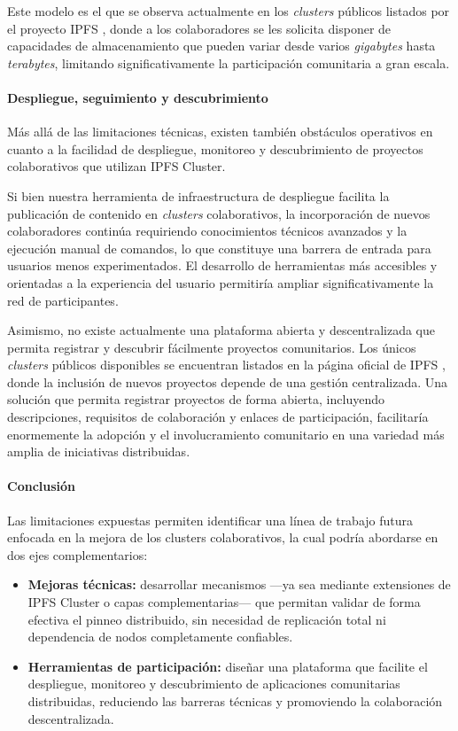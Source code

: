 Este modelo es el que se observa actualmente en los \textit{clusters} públicos listados por el proyecto IPFS \cite{collaborative-clusters}, donde a los colaboradores se les solicita disponer de capacidades de almacenamiento que pueden variar desde varios \textit{gigabytes} hasta \textit{terabytes}, limitando significativamente la participación comunitaria a gran escala.

\paragraph{Despliegue, seguimiento y descubrimiento}

Más allá de las limitaciones técnicas, existen también obstáculos operativos en cuanto a la facilidad de despliegue, monitoreo y descubrimiento de proyectos colaborativos que utilizan IPFS Cluster.

Si bien nuestra herramienta de infraestructura de despliegue facilita la publicación de contenido en \textit{clusters} colaborativos, la incorporación de nuevos colaboradores continúa requiriendo conocimientos técnicos avanzados y la ejecución manual de comandos, lo que constituye una barrera de entrada para usuarios menos experimentados. El desarrollo de herramientas más accesibles y orientadas a la experiencia del usuario permitiría ampliar significativamente la red de participantes.

Asimismo, no existe actualmente una plataforma abierta y descentralizada que permita registrar y descubrir fácilmente proyectos comunitarios. Los únicos \textit{clusters} públicos disponibles se encuentran listados en la página oficial de IPFS \cite{collaborative-clusters}, donde la inclusión de nuevos proyectos depende de una gestión centralizada. Una solución que permita registrar proyectos de forma abierta, incluyendo descripciones, requisitos de colaboración y enlaces de participación, facilitaría enormemente la adopción y el involucramiento comunitario en una variedad más amplia de iniciativas distribuidas.

\paragraph{Conclusión}

Las limitaciones expuestas permiten identificar una línea de trabajo futura enfocada en la mejora de los clusters colaborativos, la cual podría abordarse en dos ejes complementarios:

\begin{itemize}
    \item \textbf{Mejoras técnicas:} desarrollar mecanismos —ya sea mediante extensiones de IPFS Cluster o capas complementarias— que permitan validar de forma efectiva el pinneo distribuido, sin necesidad de replicación total ni dependencia de nodos completamente confiables.
    \item \textbf{Herramientas de participación:} diseñar una plataforma que facilite el despliegue, monitoreo y descubrimiento de aplicaciones comunitarias distribuidas, reduciendo las barreras técnicas y promoviendo la colaboración descentralizada.
\end{itemize}

